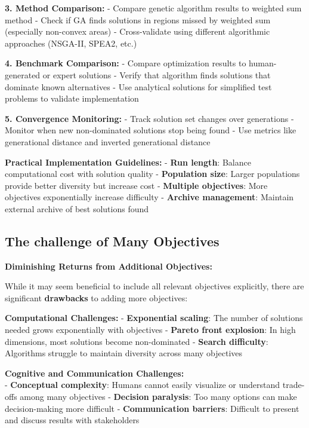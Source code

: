 \documentclass[
  letterpaper,
  DIV=11,
  numbers=noendperiod]{scrreprt}
\begin{document}
\textbf{3. Method Comparison:} - Compare genetic algorithm results to
weighted sum method - Check if GA finds solutions in regions missed by
weighted sum (especially non-convex areas) - Cross-validate using
different algorithmic approaches (NSGA-II, SPEA2, etc.)

\textbf{4. Benchmark Comparison:} - Compare optimization results to
human-generated or expert solutions - Verify that algorithm finds
solutions that dominate known alternatives - Use analytical solutions
for simplified test problems to validate implementation

\textbf{5. Convergence Monitoring:} - Track solution set changes over
generations - Monitor when new non-dominated solutions stop being found
- Use metrics like generational distance and inverted generational
distance

\textbf{Practical Implementation Guidelines:} - \textbf{Run length}:
Balance computational cost with solution quality - \textbf{Population
size}: Larger populations provide better diversity but increase cost -
\textbf{Multiple objectives}: More objectives exponentially increase
difficulty - \textbf{Archive management}: Maintain external archive of
best solutions found

\subsection{The challenge of Many
Objectives}\label{the-challenge-of-many-objectives}

\textbf{Diminishing Returns from Additional Objectives:}

While it may seem beneficial to include all relevant objectives
explicitly, there are significant \textbf{drawbacks} to adding more
objectives:

\textbf{Computational Challenges:} - \textbf{Exponential scaling}: The
number of solutions needed grows exponentially with objectives -
\textbf{Pareto front explosion}: In high dimensions, most solutions
become non-dominated - \textbf{Search difficulty}: Algorithms struggle
to maintain diversity across many objectives

\textbf{Cognitive and Communication Challenges:}\\
- \textbf{Conceptual complexity}: Humans cannot easily visualize or
understand trade-offs among many objectives - \textbf{Decision
paralysis}: Too many options can make decision-making more difficult -
\textbf{Communication barriers}: Difficult to present and discuss
results with stakeholders
\end{document}
